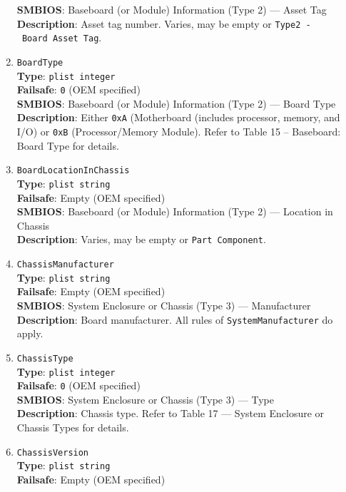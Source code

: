 \documentclass[]{article}
\begin{document}
\begin{enumerate}
  \textbf{SMBIOS}: Baseboard (or Module) Information (Type 2) --- Asset
  Tag\\
  \textbf{Description}: Asset tag number. Varies, may be empty or
  \texttt{Type2\ -\ Board\ Asset\ Tag}.
\item
  \texttt{BoardType}\\
  \textbf{Type}: \texttt{plist\ integer}\\
  \textbf{Failsafe}: \texttt{0} (OEM specified)\\
  \textbf{SMBIOS}: Baseboard (or Module) Information (Type 2) --- Board
  Type\\
  \textbf{Description}: Either \texttt{0xA} (Motherboard (includes
  processor, memory, and I/O) or \texttt{0xB} (Processor/Memory Module).
  Refer to Table 15 -- Baseboard: Board Type for details.
\item
  \texttt{BoardLocationInChassis}\\
  \textbf{Type}: \texttt{plist\ string}\\
  \textbf{Failsafe}: Empty (OEM specified)\\
  \textbf{SMBIOS}: Baseboard (or Module) Information (Type 2) --- Location
  in Chassis\\
  \textbf{Description}: Varies, may be empty or
  \texttt{Part\ Component}.
\item
  \texttt{ChassisManufacturer}\\
  \textbf{Type}: \texttt{plist\ string}\\
  \textbf{Failsafe}: Empty (OEM specified)\\
  \textbf{SMBIOS}: System Enclosure or Chassis (Type 3) --- Manufacturer\\
  \textbf{Description}: Board manufacturer. All rules of
  \texttt{SystemManufacturer} do apply.
\item
  \texttt{ChassisType}\\
  \textbf{Type}: \texttt{plist\ integer}\\
  \textbf{Failsafe}: \texttt{0} (OEM specified)\\
  \textbf{SMBIOS}: System Enclosure or Chassis (Type 3) --- Type\\
  \textbf{Description}: Chassis type. Refer to Table 17 --- System
  Enclosure or Chassis Types for details.
\item
  \texttt{ChassisVersion}\\
  \textbf{Type}: \texttt{plist\ string}\\
  \textbf{Failsafe}: Empty (OEM specified)\\

\end{enumerate}
\end{document}
